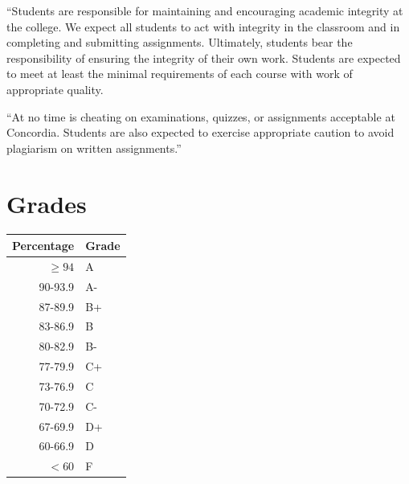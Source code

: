\documentclass{tufte-handout}
\begin{document}
``Students are responsible for maintaining and encouraging academic integrity at the college. We expect all students to act with integrity in the classroom and in completing and submitting assignments. Ultimately, students bear the responsibility of ensuring the integrity of their own work. Students are expected to meet at least the minimal requirements of each course with work of appropriate quality. 


``At no time is cheating on examinations, quizzes, or assignments acceptable at Concordia. Students are also expected to exercise appropriate caution to avoid plagiarism on written assignments.''

\newpage


\section{Grades}



\begin{margintable}
\begin{tabular}{rl}
Percentage & Grade \\
\hline 
$\ge94$ & A \\
90-93.9 & A- \\
87-89.9 & B+ \\
83-86.9 & B \\
80-82.9 & B- \\
77-79.9 & C+ \\
73-76.9 & C \\
70-72.9 & C- \\
67-69.9 & D+ \\
60-66.9 & D \\
$<60$ & F \\
\hline
\end{tabular}
\end{margintable}
\end{document}
